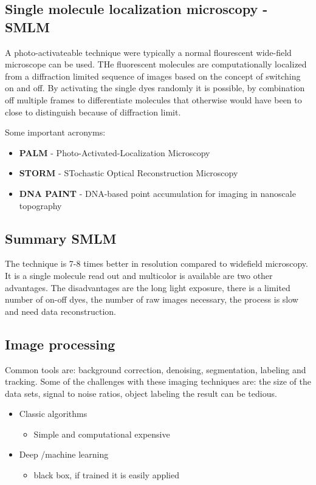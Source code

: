 	\subsection{Single molecule localization microscopy - SMLM}
	A photo-activateable technique were typically a normal flourescent wide-field microscope can be used. THe fluorescent molecules are computationally localized from a diffraction limited sequence of images based on the concept of switching on and off. By activating the single dyes randomly it is possible, by combination off multiple frames to differentiate molecules that otherwise would have been to close to distinguish because of diffraction limit. 

	Some important acronyms:
	\begin{itemize}
	 	\item \textbf{PALM} - Photo-Activated-Localization Microscopy
	 	\item \textbf{STORM} - STochastic Optical Reconstruction Microscopy
	 	\item \textbf{DNA PAINT} - DNA-based point accumulation for imaging in nanoscale topography
	 \end{itemize} 
	
	\subsection{Summary SMLM}
	The technique is 7-8 times better in resolution compared to widefield microscopy. It is a single molecule read out and multicolor is available are two other advantages. The disadvantages are the long light exposure, there is a limited number of on-off dyes, the number of raw images necessary, the process is slow and need data reconstruction. 


	\subsection{Image processing}
	Common tools are: background correction, denoising, segmentation, labeling and tracking. Some of the challenges with these imaging techniques are: the size of the data sets, signal to noise ratios, object labeling the result can be tedious.

	\begin{itemize}
		\item Classic algorithms
		\begin{itemize}
			\item Simple and computational expensive
		\end{itemize}
		\item Deep /machine learning
		\begin{itemize}
			\item black box, if trained it is easily applied
		\end{itemize}
	\end{itemize}

